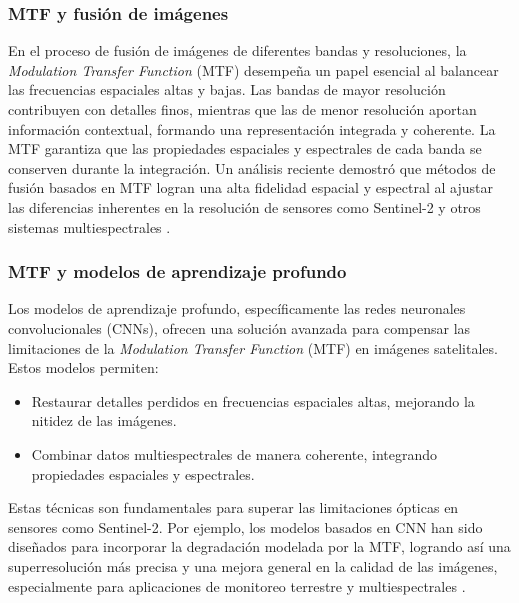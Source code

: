         
        \subsubsection{MTF y fusión de imágenes}

            En el proceso de fusión de imágenes de diferentes bandas y resoluciones, la \textit{Modulation Transfer Function} (MTF) desempeña un papel esencial al balancear las frecuencias espaciales altas y bajas. Las bandas de mayor resolución contribuyen con detalles finos, mientras que las de menor resolución aportan información contextual, formando una representación integrada y coherente. La MTF garantiza que las propiedades espaciales y espectrales de cada banda se conserven durante la integración. Un análisis reciente demostró que métodos de fusión basados en MTF logran una alta fidelidad espacial y espectral al ajustar las diferencias inherentes en la resolución de sensores como Sentinel-2 y otros sistemas multiespectrales \autocite{zhu2024fusion}.
            
        
        \subsubsection{MTF y modelos de aprendizaje profundo}

            Los modelos de aprendizaje profundo, específicamente las redes neuronales convolucionales (CNNs), ofrecen una solución avanzada para compensar las limitaciones de la \textit{Modulation Transfer Function} (MTF) en imágenes satelitales. Estos modelos permiten:
            
            \begin{itemize}
                \item Restaurar detalles perdidos en frecuencias espaciales altas, mejorando la nitidez de las imágenes.
                \item Combinar datos multiespectrales de manera coherente, integrando propiedades espaciales y espectrales.
            \end{itemize}
            
            Estas técnicas son fundamentales para superar las limitaciones ópticas en sensores como Sentinel-2. Por ejemplo, los modelos basados en CNN han sido diseñados para incorporar la degradación modelada por la MTF, logrando así una superresolución más precisa y una mejora general en la calidad de las imágenes, especialmente para aplicaciones de monitoreo terrestre y multiespectrales \autocite{vasilescu2023cnn}.
                
